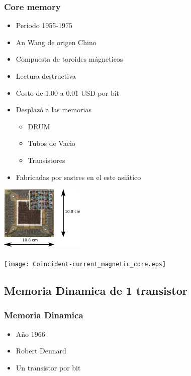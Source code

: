 \documentclass{beamer}
\begin{document}
\begin{frame}
\frametitle{Core memory}
\begin{minipage}[c]{7.5cm}
	\begin{itemize}
		\item Periodo 1955-1975
		\item An Wang de origen Chino
		\item Compuesta de toroides mágneticos
		\item Lectura destructiva
		\item Costo de 1.00 a 0.01 USD por bit
		\item Desplazó a las memorias
			\begin{itemize}
				\item DRUM
				\item Tubos de Vacio
				\item Transistores
			\end{itemize}
		\item Fabricadas por sastres en el este asiático
	\end{itemize}
\end{minipage}
\begin{minipage}[c]{4cm}
	\includegraphics[width=4cm]{Ferrite_core_memory.eps} \\ \\
	\texttt{[image: Coincident-current\_magnetic\_core.eps]}
\end{minipage}
\end{frame}

\subsection{Memoria Dinamica de 1 transistor}
\begin{frame}
\frametitle{Memoria Dinamica}
\begin{itemize}
	\item Año 1966
	\item Robert Dennard
	\item Un transistor por bit
\end{itemize}
\end{frame}
\end{document}
